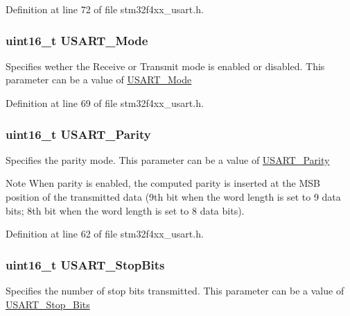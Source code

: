 Definition at line 72 of file stm32f4xx\-\_\-usart.\-h.

\hypertarget{struct_u_s_a_r_t___init_type_def_a1a581f24451bf5a4a210bab8d68998e2}{
\subsubsection[{U\-S\-A\-R\-T\-\_\-\-Mode}]{\setlength{\rightskip}{0pt plus 5cm}uint16\-\_\-t U\-S\-A\-R\-T\-\_\-\-Mode}}\label{struct_u_s_a_r_t___init_type_def_a1a581f24451bf5a4a210bab8d68998e2}
Specifies wether the Receive or Transmit mode is enabled or disabled. This parameter can be a value of \hyperlink{group___u_s_a_r_t___mode}{U\-S\-A\-R\-T\-\_\-\-Mode} 

Definition at line 69 of file stm32f4xx\-\_\-usart.\-h.

\hypertarget{struct_u_s_a_r_t___init_type_def_a4edcc84644c8553a1a6e841c48ea8413}{
\subsubsection[{U\-S\-A\-R\-T\-\_\-\-Parity}]{\setlength{\rightskip}{0pt plus 5cm}uint16\-\_\-t U\-S\-A\-R\-T\-\_\-\-Parity}}\label{struct_u_s_a_r_t___init_type_def_a4edcc84644c8553a1a6e841c48ea8413}
Specifies the parity mode. This parameter can be a value of \hyperlink{group___u_s_a_r_t___parity}{U\-S\-A\-R\-T\-\_\-\-Parity} \begin{DoxyNote}{Note}
When parity is enabled, the computed parity is inserted at the M\-S\-B position of the transmitted data (9th bit when the word length is set to 9 data bits; 8th bit when the word length is set to 8 data bits). 
\end{DoxyNote}


Definition at line 62 of file stm32f4xx\-\_\-usart.\-h.

\hypertarget{struct_u_s_a_r_t___init_type_def_aa58409990a6a0bc99f432eb90e204c0f}{
\subsubsection[{U\-S\-A\-R\-T\-\_\-\-Stop\-Bits}]{\setlength{\rightskip}{0pt plus 5cm}uint16\-\_\-t U\-S\-A\-R\-T\-\_\-\-Stop\-Bits}}\label{struct_u_s_a_r_t___init_type_def_aa58409990a6a0bc99f432eb90e204c0f}
Specifies the number of stop bits transmitted. This parameter can be a value of \hyperlink{group___u_s_a_r_t___stop___bits}{U\-S\-A\-R\-T\-\_\-\-Stop\-\_\-\-Bits} 

